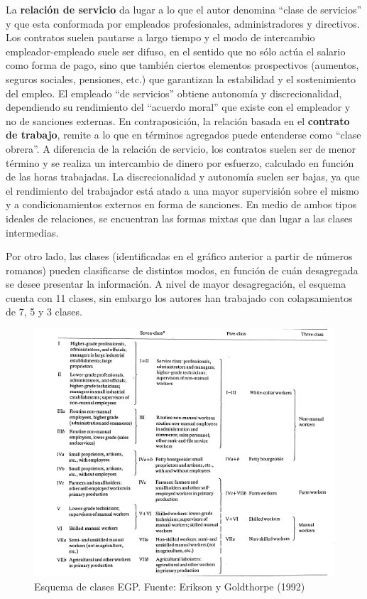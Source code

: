\documentclass[
]{book}
\begin{document}
La \textbf{relación de servicio} da lugar a lo que el autor denomina ``clase de servicios'' y que esta conformada por empleados profesionales, administradores y directivos. Los contratos suelen pautarse a largo tiempo y el modo de intercambio empleador-empleado suele ser difuso, en el sentido que no sólo actúa el salario como forma de pago, sino que también ciertos elementos prospectivos (aumentos, seguros sociales, pensiones, etc.) que garantizan la estabilidad y el sostenimiento del empleo. El empleado ``de servicios'' obtiene autonomía y discrecionalidad, dependiendo su rendimiento del ``acuerdo moral'' que existe con el empleador y no de sanciones externas. En contraposición, la relación basada en el \textbf{contrato de trabajo}, remite a lo que en términos agregados puede entenderse como ``clase obrera''. A diferencia de la relación de servicio, los contratos suelen ser de menor término y se realiza un intercambio de dinero por esfuerzo, calculado en función de las horas trabajadas. La discrecionalidad y autonomía suelen ser bajas, ya que el rendimiento del trabajador está atado a una mayor supervisión sobre el mismo y a condicionamientos externos en forma de sanciones. En medio de ambos tipos ideales de relaciones, se encuentran las formas mixtas que dan lugar a las clases intermedias.

Por otro lado, las clases (identificadas en el gráfico anterior a partir de números romanos) pueden clasificarse de distintos modos, en función de cuán desagregada se desee presentar la información. A nivel de mayor desagregación, el esquema cuenta con 11 clases, sin embargo los autores han trabajado con colapsamientos de 7, 5 y 3 clases.

\begin{figure}

{\centering \includegraphics[width=0.8\linewidth]{imagenes/egp2} 

}

\caption{Esquema de clases EGP. Fuente: Erikson y Goldthorpe (1992)}\label{fig:unnamed-chunk-57}
\end{figure}
\end{document}
